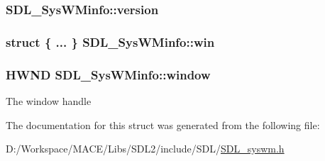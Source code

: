 \subsubsection[{\texorpdfstring{version}{version}}]{ S\+D\+L\+\_\+\+Sys\+W\+Minfo\+::version}\hypertarget{struct_s_d_l___sys_w_minfo_ac3a70af022d4849e9ff546595e94627f}{}\label{struct_s_d_l___sys_w_minfo_ac3a70af022d4849e9ff546595e94627f}
\subsubsection[{\texorpdfstring{win}{win}}]{\setlength{\rightskip}{0pt plus 5cm}struct \{ ... \}   S\+D\+L\+\_\+\+Sys\+W\+Minfo\+::win}\hypertarget{struct_s_d_l___sys_w_minfo_a6319c3f4bccd2505edc7023380981a27}{}\label{struct_s_d_l___sys_w_minfo_a6319c3f4bccd2505edc7023380981a27}
\subsubsection[{\texorpdfstring{window}{window}}]{\setlength{\rightskip}{0pt plus 5cm}H\+W\+ND S\+D\+L\+\_\+\+Sys\+W\+Minfo\+::window}\hypertarget{struct_s_d_l___sys_w_minfo_af06225591ff07e837bbd037728a525b9}{}\label{struct_s_d_l___sys_w_minfo_af06225591ff07e837bbd037728a525b9}
The window handle 

The documentation for this struct was generated from the following file\+:\begin{DoxyCompactItemize}
\item 
D\+:/\+Workspace/\+M\+A\+C\+E/\+Libs/\+S\+D\+L2/include/\+S\+D\+L/\hyperlink{_s_d_l__syswm_8h}{S\+D\+L\+\_\+syswm.\+h}\end{DoxyCompactItemize}
